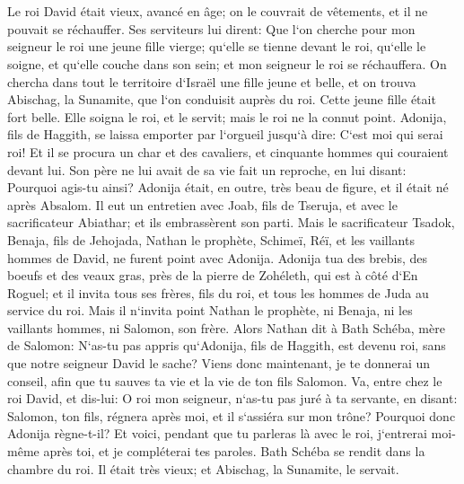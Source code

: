 

\chapter{}

\verse Le roi David était vieux, avancé en âge; on le couvrait de vêtements, et il ne pouvait se réchauffer. 
\verse Ses serviteurs lui dirent: Que l`on cherche pour mon seigneur le roi une jeune fille vierge; qu`elle se tienne devant le roi, qu`elle le soigne, et qu`elle couche dans son sein; et mon seigneur le roi se réchauffera. 
\verse On chercha dans tout le territoire d`Israël une fille jeune et belle, et on trouva Abischag, la Sunamite, que l`on conduisit auprès du roi. 
\verse Cette jeune fille était fort belle. Elle soigna le roi, et le servit; mais le roi ne la connut point. 
\verse Adonija, fils de Haggith, se laissa emporter par l`orgueil jusqu`à dire: C`est moi qui serai roi! Et il se procura un char et des cavaliers, et cinquante hommes qui couraient devant lui. 
\verse Son père ne lui avait de sa vie fait un reproche, en lui disant: Pourquoi agis-tu ainsi? Adonija était, en outre, très beau de figure, et il était né après Absalom. 
\verse Il eut un entretien avec Joab, fils de Tseruja, et avec le sacrificateur Abiathar; et ils embrassèrent son parti. 
\verse Mais le sacrificateur Tsadok, Benaja, fils de Jehojada, Nathan le prophète, Schimeï, Réï, et les vaillants hommes de David, ne furent point avec Adonija. 
\verse Adonija tua des brebis, des boeufs et des veaux gras, près de la pierre de Zohéleth, qui est à côté d`En Roguel; et il invita tous ses frères, fils du roi, et tous les hommes de Juda au service du roi. 
\verse Mais il n`invita point Nathan le prophète, ni Benaja, ni les vaillants hommes, ni Salomon, son frère. 
\verse Alors Nathan dit à Bath Schéba, mère de Salomon: N`as-tu pas appris qu`Adonija, fils de Haggith, est devenu roi, sans que notre seigneur David le sache? 
\verse Viens donc maintenant, je te donnerai un conseil, afin que tu sauves ta vie et la vie de ton fils Salomon. 
\verse Va, entre chez le roi David, et dis-lui: O roi mon seigneur, n`as-tu pas juré à ta servante, en disant: Salomon, ton fils, régnera après moi, et il s`assiéra sur mon trône? Pourquoi donc Adonija règne-t-il? 
\verse Et voici, pendant que tu parleras là avec le roi, j`entrerai moi-même après toi, et je compléterai tes paroles. 
\verse Bath Schéba se rendit dans la chambre du roi. Il était très vieux; et Abischag, la Sunamite, le servait. 
